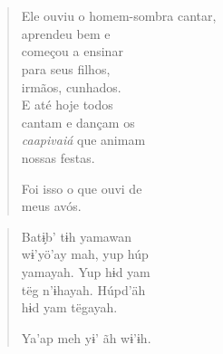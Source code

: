 \chapter*{}

\mbox{}\vspace*{\fill}

\begin{verse}
Ele ouviu o homem-sombra cantar,\\
aprendeu bem e\\
começou a ensinar\\
para seus filhos,\\
irmãos, cunhados.\\
E até hoje todos\\
cantam e dançam os\\
\textit{caapivaiá} que animam\\
nossas festas.

Foi isso o que ouvi de\\
meus avós.
\end{verse}

\begin{verse}
Batɨ̗b’ tɨh yamawan\\
wɨ’yö’ay mah, yup húp\\
yamayah. Yup hɨd yam\\
tëg n’ɨhayah. Húpd’äh\\
hɨd yam tëgayah.

Ya’ap meh yɨ’ ãh wɨ’ɨh.
\end{verse}

\vspace*{\fill}

